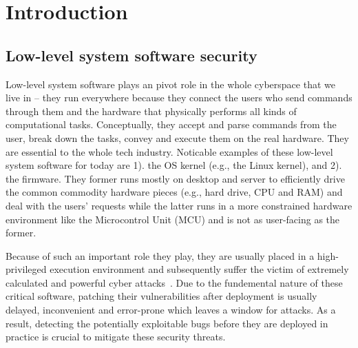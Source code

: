 \section{Introduction}
\subsection{Low-level system software security}
Low-level system software plays an pivot role in the whole cyberspace that we live in -- they run everywhere because they connect the users who send commands through them and the hardware that physically performs all kinds of computational tasks. 
Conceptually, they accept and parse commands from the user, break down the tasks, convey and execute them on the real hardware.  
They are essential to the whole tech industry. 
Noticable examples of these low-level system software for today are 1). the OS kernel (e.g., the Linux kernel), and 2). the firmware. They former runs mostly on desktop and server to efficiently drive the common commodity hardware pieces (e.g., hard drive, CPU and RAM) and deal with the users' requests while the latter runs in a more constrained hardware environment like the Microcontrol Unit (MCU) and is not as user-facing as the former. 

Because of such an important role they play, they are usually placed in a high-privileged execution environment and subsequently suffer the victim of extremely calculated and powerful cyber attacks~\cite{kuruvila_hardware-assisted_2021,maggi_attacks_2020,miller_remote_2015}. Due to the fundemental nature of these critical software, patching their vulnerabilities after deployment is usually delayed, inconvenient and error-prone which leaves a window for attacks. As a result, detecting the potentially exploitable bugs before they are deployed in practice is crucial to mitigate these security threats.  

